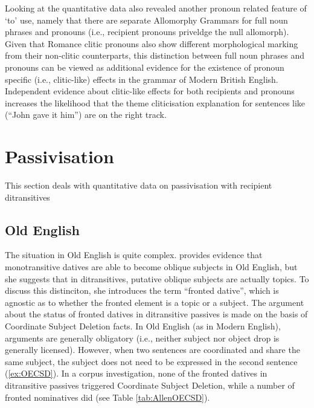 	Looking at the quantitative data also revealed another pronoun related feature of `to' use, namely that there are separate Allomorphy Grammars for full noun phrases and pronouns (i.e., recipient pronouns priveldge the null allomorph). Given that Romance clitic pronouns also show different morphological marking from their non-clitic counterparts, this distinction between full noun phrases and pronouns can be viewed as additional evidence for the existence of pronoun specific (i.e., clitic-like) effects in the grammar of Modern British English. Independent evidence about clitic-like effects for both recipients and pronouns increases the likelihood that the theme cliticisation explanation for sentences like (``John gave it him'') are on the right track.

\section{Passivisation}

	This section deals with quantitative data on passivisation with recipient ditransitives 

\subsection{Old English}
	The situation in Old English is quite complex. \cite{Allen.1999} provides evidence that monotransitive datives are able to become oblique subjects in Old English, but she suggests that in ditransitives, putative oblique subjects are actually topics. To discuss this distinciton, she introduces the term ``fronted dative'', which is agnostic as to whether the fronted element is a topic or a subject. The argument about the status of fronted datives in ditransitive passives is made on the basis of Coordinate Subject Deletion facts. In Old English (as in Modern English), arguments are generally obligatory (i.e., neither subject nor object drop is generally licensed). However, when two sentences are coordinated and share the same subject, the subject does not need to be expressed in the second sentence (\ref{ex:OECSD}). In a corpus investigation, none of the fronted datives in ditransitive passives triggered Coordinate Subject Deletion, while a number of fronted nominatives did (see Table \ref{tab:AllenOECSD}). 

